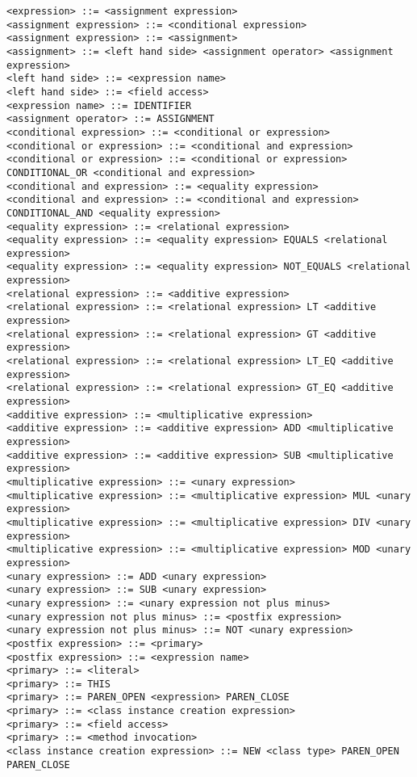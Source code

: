 \documentclass [a4paper,abstracton,titlepage]{scrartcl}
\begin{document}
\begin{lstlisting}<expression> ::= <assignment expression>
<assignment expression> ::= <conditional expression>
<assignment expression> ::= <assignment>
<assignment> ::= <left hand side> <assignment operator> <assignment expression>
<left hand side> ::= <expression name>
<left hand side> ::= <field access>
<expression name> ::= IDENTIFIER
<assignment operator> ::= ASSIGNMENT
<conditional expression> ::= <conditional or expression>
<conditional or expression> ::= <conditional and expression>
<conditional or expression> ::= <conditional or expression> CONDITIONAL_OR <conditional and expression>
<conditional and expression> ::= <equality expression>
<conditional and expression> ::= <conditional and expression> CONDITIONAL_AND <equality expression>
<equality expression> ::= <relational expression>
<equality expression> ::= <equality expression> EQUALS <relational expression>
<equality expression> ::= <equality expression> NOT_EQUALS <relational expression>
<relational expression> ::= <additive expression>
<relational expression> ::= <relational expression> LT <additive expression>
<relational expression> ::= <relational expression> GT <additive expression>
<relational expression> ::= <relational expression> LT_EQ <additive expression>
<relational expression> ::= <relational expression> GT_EQ <additive expression>
<additive expression> ::= <multiplicative expression>
<additive expression> ::= <additive expression> ADD <multiplicative expression>
<additive expression> ::= <additive expression> SUB <multiplicative expression>
<multiplicative expression> ::= <unary expression>
<multiplicative expression> ::= <multiplicative expression> MUL <unary expression>
<multiplicative expression> ::= <multiplicative expression> DIV <unary expression>
<multiplicative expression> ::= <multiplicative expression> MOD <unary expression>
<unary expression> ::= ADD <unary expression>
<unary expression> ::= SUB <unary expression>
<unary expression> ::= <unary expression not plus minus>
<unary expression not plus minus> ::= <postfix expression>
<unary expression not plus minus> ::= NOT <unary expression>
<postfix expression> ::= <primary>
<postfix expression> ::= <expression name>
<primary> ::= <literal>
<primary> ::= THIS
<primary> ::= PAREN_OPEN <expression> PAREN_CLOSE
<primary> ::= <class instance creation expression>
<primary> ::= <field access>
<primary> ::= <method invocation>
<class instance creation expression> ::= NEW <class type> PAREN_OPEN PAREN_CLOSE

\end{lstlisting}
\end{document}
